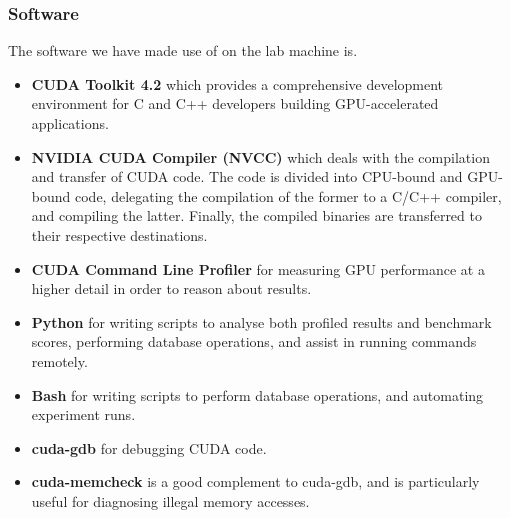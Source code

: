 \subsubsection{Software}
The software we have made use of on the lab machine is.
\begin{itemize}
  \item \textbf{CUDA Toolkit 4.2} which provides a comprehensive development environment for C and C++ developers building GPU-accelerated applications.
  \item \textbf{NVIDIA CUDA Compiler (NVCC)} which deals with the compilation and transfer of CUDA code. The code is divided into CPU-bound and GPU-bound code, delegating the compilation of the former to a C/C++ compiler, and compiling the latter. Finally, the compiled binaries are transferred to their respective destinations.
  \item \textbf{CUDA Command Line Profiler} for measuring GPU performance at a higher detail in order to reason about results.
  \item \textbf{Python} for writing scripts to analyse both profiled results and benchmark scores, performing database operations, and assist in running commands remotely.
  \item \textbf{Bash} for writing scripts to perform database operations, and automating experiment runs.
  \item \textbf{cuda-gdb} for debugging CUDA code.
  \item \textbf{cuda-memcheck} is a good complement to cuda-gdb, and is particularly useful for diagnosing illegal memory accesses.
\end{itemize}
